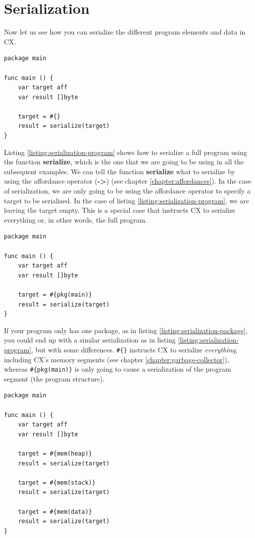 \documentclass[11pt,fleqn,openany]{book} %
\begin{document}
\section{Serialization}
\label{section:serialization}

Now let us see how you can serialize the different program elements and data in CX.

\begin{lstlisting}[caption={Serialization of a program},captionpos=b,label={listing:serialization-program}]
package main

func main () {
    var target aff
    var result []byte
    
    target = #{}
    result = serialize(target)
}
\end{lstlisting}

Listing \ref{listing:serialization-program} shows how to serialize a full program using the function \textbf{serialize}, which is the one that we are going to be using in all the subsequent examples. We can tell the function \textbf{serialize} what to serialize by using the affordance operator (\textbf{->}) (see chapter \ref{chapter:affordances}). In the case of serialization, we are only going to be using the affordance operator to specify a target to be serialized. In the case of listing \ref{listing:serialization-program}, we are leaving the target empty. This is a special case that instructs CX to serialize everything or, in other words, the full program.

\begin{lstlisting}[caption={Serialization of a package},captionpos=b,label={listing:serialization-package}]
package main

func main () {
    var target aff
    var result []byte
    
    target = #{pkg(main)}
    result = serialize(target)
}
\end{lstlisting}

If your program only has one package, as in listing \ref{listing:serialization-package}, you could end up with a similar serialization as in listing \ref{listing:serialization-program}, but with some differences. \lstinline|#{}| instructs CX to serialize \emph{everything}, including CX's memory segments (see chapter \ref{chapter:garbage-collector}), whereas \lstinline|#{pkg(main)}| is only going to cause a serialization of the program segment (the program structure).

\begin{lstlisting}[caption={Serialization of the memory segments},captionpos=b,label={listing:serialization-memory-segments}]
package main

func main () {
    var target aff
    var result []byte
    
    target = #{mem(heap)}
    result = serialize(target)
    
    target = #{mem(stack)}
    result = serialize(target)
    
    target = #{mem(data)}
    result = serialize(target)
}
\end{lstlisting}
\end{document}
